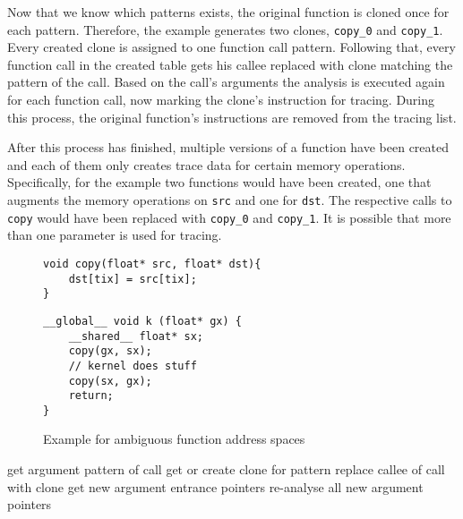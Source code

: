 Now that we know which patterns exists, the original function is cloned once for each pattern. Therefore, the example generates two clones, \verb|copy_0| and \verb|copy_1|. Every created clone is assigned to one function call pattern. Following that, every function call in the created table gets his callee replaced with clone matching the pattern of the call. Based on the call's arguments the analysis is executed again for each function call, now marking the clone's instruction for tracing. During this process, the original function's instructions are removed from the tracing list.

After this process has finished, multiple versions of a function have been created and each of them only creates trace data for certain memory operations. Specifically, for the example two functions would have been created, one that augments the memory operations on \verb|src| and one for \verb|dst|. The respective calls to \verb|copy| would have been replaced with \verb|copy_0| and \verb|copy_1|. It is possible that more than one parameter is used for tracing.

\begin{figure}[t]
	\begin{minipage}{0.45\textwidth}
		
		\begin{lstlisting}[style=c]
void copy(float* src, float* dst){
	dst[tix] = src[tix];
}\end{lstlisting}
	\end{minipage}\hfill
	\begin{minipage}{0.45\textwidth}
			\begin{lstlisting}[style=c]
__global__ void k (float* gx) {
	__shared__ float* sx;
	copy(gx, sx);
	// kernel does stuff
	copy(sx, gx);
	return;
}\end{lstlisting}
	\end{minipage}\hfill
\begin{minipage}{\textwidth}
	
\end{minipage}\vfill
	\caption{Example for ambiguous function address spaces}
	\label{func-vers}
\end{figure}
\begin{algorithm}[t]
	 {
		get argument pattern of call\;
		get or create clone for pattern\;
		replace callee of call with clone\;
		get new argument entrance pointers\;
	}
	 {
		re-analyse all new argument pointers\;
	}
	\caption{Algorithm for function specialization}
	\label{func-algo}
\end{algorithm}

